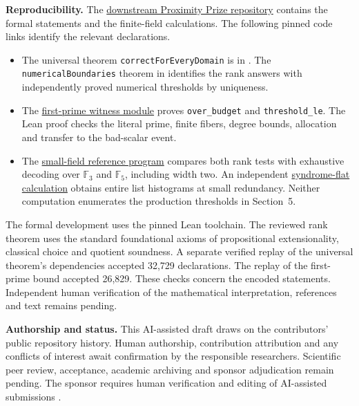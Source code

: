 \documentclass[11pt,letterpaper]{article}
\newcommand{\src}[2]{\href{https://github.com/SlopDotCash/proximityprize/blob/#1/ArkLib/Research/ProximityGap/#2.lean}{\texttt{\detokenize{#2}}}}
\newcommand{\repo}{\href{https://github.com/SlopDotCash/proximityprize}{downstream Proximity Prize repository}}
\begin{document}
\textbf{Reproducibility.} The \repo{} contains the formal statements and the finite-field calculations. The following pinned code links identify the relevant declarations.
\begin{itemize}\setlength\itemsep{2pt}\setlength\topsep{2pt}
\item The universal theorem \texttt{correctForEveryDomain} is in \src{a62f136b45bdd13674d4445a56164402b047a78f}{RankReview}. The \texttt{numericalBoundaries} theorem in \src{a62f136b45bdd13674d4445a56164402b047a78f}{RankKnownDomain} identifies the rank answers with independently proved numerical thresholds by uniqueness.
\item The \href{https://github.com/SlopDotCash/proximityprize/blob/0470eebb378fd29933b05b3d827aa483d61eebd2/ArkLib/Research/ProximityGap/Frontier/FirstPrimeSepticCores.lean}{first-prime witness module} proves \texttt{over\_budget} and \texttt{threshold\_le}. The Lean proof checks the literal prime, finite fibers, degree bounds, allocation and transfer to the bad-scalar event.
\item The \href{https://github.com/SlopDotCash/proximityprize/blob/a62f136b45bdd13674d4445a56164402b047a78f/scripts/probes/probe_supplied_domain_rank_thresholds.py}{small-field reference program} compares both rank tests with exhaustive decoding over $\mathbb F_3$ and $\mathbb F_5$, including width two. An independent \href{https://github.com/SlopDotCash/proximityprize/blob/3c8f9fc757ad76861b893a159d42391a5785f623/docs/research/proximity-gap/syndrome-flat-list-profile.md}{syndrome-flat calculation} obtains entire list histograms at small redundancy. Neither computation enumerates the production thresholds in Section~5.
\end{itemize}
The formal development uses the pinned Lean toolchain. The reviewed rank theorem uses the standard foundational axioms of propositional extensionality, classical choice and quotient soundness. A separate verified replay of the universal theorem's dependencies accepted 32,729 declarations. The replay of the first-prime bound accepted 26,829. These checks concern the encoded statements. Independent human verification of the mathematical interpretation, references and text remains pending.

\textbf{Authorship and status.} This AI-assisted draft draws on the contributors' public repository history. Human authorship, contribution attribution and any conflicts of interest await confirmation by the responsible researchers. Scientific peer review, acceptance, academic archiving and sponsor adjudication remain pending. The sponsor requires human verification and editing of AI-assisted submissions \cite{sponsor}.
\end{document}
